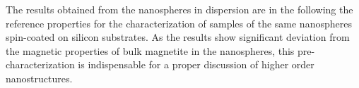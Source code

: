 \documentclass[\main/dresen_thesis.tex]{subfiles}
\begin{document}
  The results obtained from the nanospheres in dispersion are in the following the reference properties for the characterization of samples of the same nanospheres spin-coated on silicon substrates.
  As the results show significant deviation from the magnetic properties of bulk magnetite in the nanospheres, this pre-characterization is indispensable for a proper discussion of higher order nanostructures.
\end{document}
